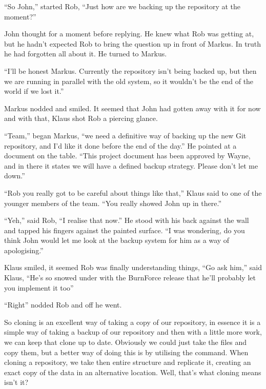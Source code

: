 \begin{trenches}
``So John,'' started Rob,
``Just how are we backing up the repository at the moment?''

John thought for a moment before replying.
He knew what Rob was getting at, but he hadn't expected Rob to bring the question up in front of Markus.
In truth he had forgotten all about it.
He turned to Markus.

``I'll be honest Markus. Currently the repository isn't being backed up, but then we are running in parallel with the old system, so it wouldn't be the end of the world if we lost it.''

Markus nodded and smiled.
It seemed that John had gotten away with it for now and with that, Klaus shot Rob a piercing glance.

``Team,'' began Markus,
``we need a definitive way of backing up the new Git repository, and I'd like it done before the end of the day.''
He pointed at a document on the table.
``This project document has been approved by Wayne, and in there it states we will have a defined backup strategy. Please don't let me down.''

\thoughtbreak

``Rob you really got to be careful about things like that,'' Klaus said to one of the younger members of the team.
``You really showed John up in there.''

``Yeh,'' said Rob,
``I realise that now.''
He stood with his back against the wall and tapped his fingers against the painted surface.
``I was wondering, do you think John would let me look at the backup system for him as a way of apologising.''

Klaus smiled, it seemed Rob was finally understanding things,
``Go ask him,'' said Klaus,
``He's so snowed under with the BurnForce release that he'll probably let you implement it too''

``Right'' nodded Rob and off he went.
\end{trenches}

So cloning is an excellent way of taking a copy of our repository, in essence it is a simple way of taking a backup of our repository and then with a little more work, we can keep that clone up to date.
Obviously we could just take the files and copy them, but a better way of doing this is by utilising the  command.
When cloning a repository, we take then entire structure and replicate it, creating an exact copy of the data in an alternative location.
Well, that's what cloning means isn't it?


